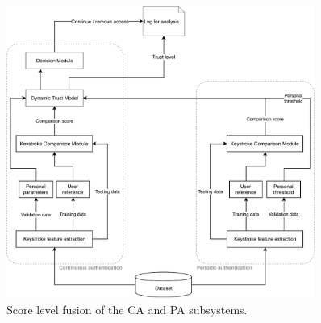 \begin{figure}[ht]
    \centering
    \includegraphics[width=0.9\textwidth]{figures/system-diagram-scorelvl.pdf}
    \caption{Score level fusion of the CA and PA subsystems. }
    \label{fig:scorelvl}
\end{figure}


%




%
%
%
